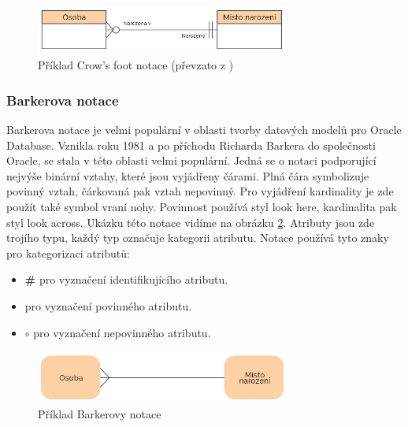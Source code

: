 \documentclass[czech,bachelor,public,dept460,male,oneside]{diploma}
\begin{document}
		\begin{figure}[!h]
			\centering
			\includegraphics[width=0.75\textwidth]{Figures/NotationExCrow}
			\caption[Příklad Crow's foot notace]{Příklad Crow's foot notace (převzato z \cite{whatIsERD})}
			\label{fig:notationExCrow}
		\end{figure}
		
		\subsubsection{Barkerova notace} \label{barker}
		Barkerova notace \cite{compErNotations} je velmi populární v oblasti tvorby datových modelů pro Oracle Database. Vznikla roku 1981 a po příchodu Richarda Barkera do společnosti Oracle, se stala v této oblasti velmi populární. Jedná se o notaci podporující nejvýše binární vztahy, které jsou vyjádřeny čárami. Plná čára symbolizuje povinný vztah, čárkovaná pak vztah nepovinný. Pro vyjádření kardinality je zde použít také symbol vraní nohy. Povinnost používá styl look here, kardinalita pak styl look across. Ukázku této notace vidíme na obrázku \ref{fig:notationExBarker}. Atributy jsou zde trojího typu, každý typ označuje kategorii atributu. Notace používá tyto znaky pro kategorizaci atributů:
		
		\begin{itemize}
			\item \textbf{\#} pro vyznačení identifikujícího atributu.
			\item \textbf{\textasteriskcentered} pro vyznačení povinného atributu.
			\item \textbf{$\circ$} pro vyznačení nepovinného atributu.
		\end{itemize}
	
		\begin{figure}[!h]
			\centering
			\includegraphics[width=0.75\textwidth]{Figures/NotationExBarker}
			\caption[Příklad Barkerovy notace]{Příklad Barkerovy notace \cite{whatIsERD}}
			\label{fig:notationExBarker}
		\end{figure}
	
\end{document}
